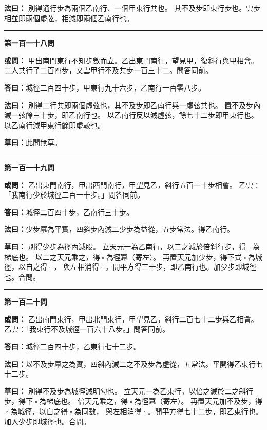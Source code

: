 \documentclass[11pt,a4paper]{article}
\let\origsquare\square
\renewcommand{\square}{\ensuremath{\origsquare}}%
\newcommand{\longline}{\noindent\rule{\textwidth}{0.4pt}}
\newcommand{\owen}[1]{%
  \par\vspace{0.4em}%
  \noindent\textcolor{problemcolor}{\textbf{或問：}}{\tradfont #1}\par\nopagebreak%
}
\newcommand{\fayue}[1]{%
  \par\noindent\textcolor{methodcolor}{\textbf{法曰：}}{\tradfont #1}\par\nopagebreak%
}
\newcommand{\tsaoyue}[1]{%
  \par\noindent\textcolor{workcolor}{\textbf{草曰：}}{\tradfont #1}\par%
}
\newcommand{\dayue}[1]{%
  \par\noindent\textcolor{anscolor}{\textbf{答曰：}}{\tradfont #1}\par\nopagebreak%
}
\newcommand{\wen}[1]{\par\vspace{0.3em}\noindent\textcolor{problemcolor}{\textbf{第#1問}}\par}
\begin{document}
\fayue{%
別得通行步為兩個乙南行、一個甲東行共也。
其不及步即東行步也。雲步相並即兩個虛弦，相減即兩個乙南行也。}

\vspace{0.5cm}
\begin{center}
\longline
\end{center}

\wen{一百一十八}
\owen{%
甲出南門東行不知步數而立。乙出東門南行，望見甲，復斜行與甲相會。
二人共行了二百四步，又雲甲行不及共步一百三十二。問答同前。}
\dayue{城徑二百四十步，甲東行九十六步，乙南行一百零八步。}

\fayue{%
別得二行共即兩個虛弦也，其不及步即乙南行與一虛弦共也。
置不及步內減一弦餘三十步，即乙南行也。
以乙南行反以減虛弦，餘七十二步即甲東行也。
以乙南行減甲東行餘即虛較也。}

\tsaoyue{此問無草。}

\vspace{0.5cm}
\begin{center}
\longline
\end{center}

\wen{一百一十九}
\owen{%
乙出東門南行，甲出西門南行，甲望見乙，斜行五百一十步相會。
乙雲：「我南行少於城徑二百一十步。」問答同前。}
\dayue{城徑二百四十步，乙南行三十步。}

\fayue{少步冪為平實，四斜步內減二少步為益從，五步常法。得乙南行。}

\tsaoyue{%
別得少步為徑內減股。
立天元一為乙南行，以二之減於倍斜行步，得$ \; \square \; $為梯底也。
以二之天元乘之，得$ \; \square \; $為徑冪（寄左）。
再置天元加少步，得下式$ \; \square \; $為城徑，以自之得$ \; \square \; $，
與左相消得$ \; \square \; $。開平方得三十步，即乙南行也。加少步即城徑也。合問。}

\vspace{0.5cm}
\begin{center}
\longline
\end{center}

\wen{一百二十}
\owen{%
乙出南門東行，甲出北門東行，甲望見乙，斜行二百七十二步與乙相會。
乙雲：「我東行不及城徑一百六十八步。」問答同前。}
\dayue{城徑二百四十步，乙東行七十二步。}

\fayue{以不及步冪之為實，四斜內減二之不及步為虛從，五常法。平開得乙東行七十二步。}

\tsaoyue{%
別得不及步為城徑減明勾也。
立天元一為乙東行，以倍之減於二之斜行步，得下$ \; \square \; $為梯底也。
倍天元乘之，得$ \; \square \; $為徑冪（寄左）。
再置天元加不及步，得$ \; \square \; $為城徑，以自之得$ \; \square \; $為同數，
與左相消得$ \; \square \; $。開平方得七十二步，即乙東行也。加入少步即城徑也。合問。}
\end{document}
